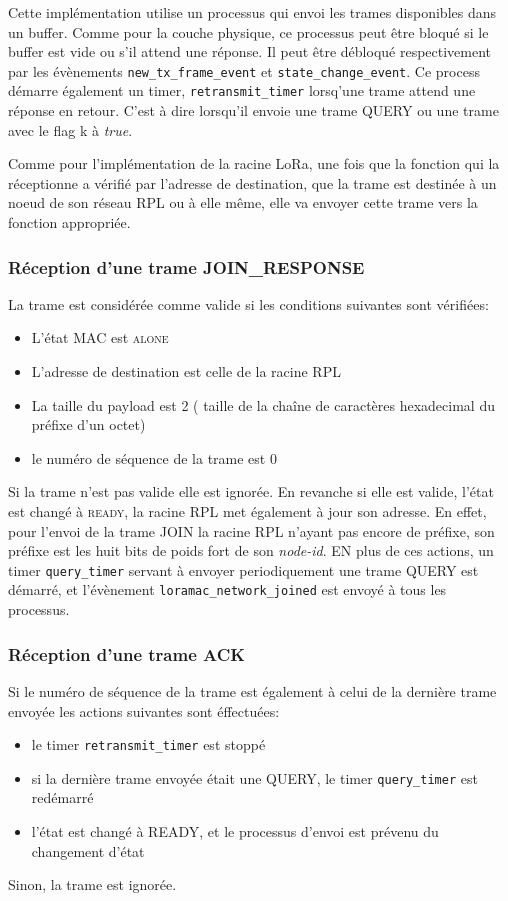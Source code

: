     Cette implémentation utilise un processus qui envoi les trames disponibles dans un buffer. 
    Comme pour la couche physique, ce processus peut être bloqué si le buffer est vide ou s'il 
    attend une réponse. Il peut être débloqué respectivement par les évènements
    \texttt{new\_tx\_frame\_event} et \texttt{state\_change\_event}. Ce process démarre également un timer, \texttt{retransmit\_timer} lorsq'une trame attend une réponse en retour. C'est à dire lorsqu'il envoie une trame QUERY ou une trame avec le flag k à \textit{true}.
    
    Comme pour l'implémentation de la racine LoRa, une fois que la fonction qui la réceptionne a vérifié par l'adresse de destination, que la trame est destinée à un noeud de son réseau RPL ou à elle même, elle va envoyer cette trame vers la fonction appropriée.

    \subsubsection*{Réception d'une trame JOIN\_RESPONSE}
        La trame est considérée comme valide si les conditions suivantes sont vérifiées:
        \begin{itemize}
            \item L'état MAC est \textsc{alone}
            \item L'adresse de destination est celle de la racine RPL
            \item La taille du payload est 2 ( taille de la chaîne de caractères hexadecimal du préfixe d'un octet)
            \item le numéro de séquence de la trame est 0
        \end{itemize}

        Si la trame n'est pas valide elle est ignorée. En revanche si elle est valide, l'état est changé à \textsc{ready}, la racine RPL met également à jour son adresse. En effet, pour l'envoi de la trame JOIN la racine RPL n'ayant pas encore de préfixe, son préfixe est les huit bits de poids fort de son \textit{node-id}. EN plus de ces actions, un timer
        \texttt{query\_timer} servant à envoyer periodiquement une trame QUERY est démarré, et l'évènement \texttt{loramac\_network\_joined} est envoyé à tous les processus.


    \subsubsection*{Réception d'une trame ACK}
        Si le numéro de séquence de la trame est également à celui de la dernière trame envoyée
        les actions suivantes sont éffectuées:
        \begin{itemize}
            \item le timer \texttt{retransmit\_timer} est stoppé
            \item si la dernière trame envoyée était une QUERY, le timer \texttt{query\_timer} est redémarré
            \item l'état est changé à READY, et le processus d'envoi est prévenu du changement d'état
        \end{itemize}
        Sinon, la trame est ignorée.

